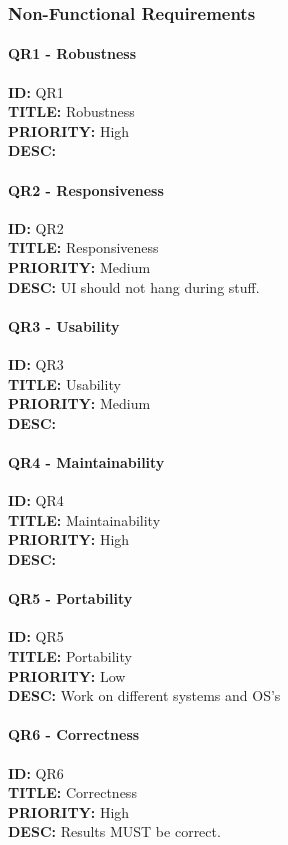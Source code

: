 \subsubsection{Non-Functional Requirements}
\paragraph*{QR1 - Robustness}
\textbf{ID:} QR1 \\
\textbf{TITLE:} Robustness \\
\textbf{PRIORITY:} High \\
\textbf{DESC:}   \\
\paragraph*{QR2 - Responsiveness} 
\textbf{ID:} QR2 \\
\textbf{TITLE:} Responsiveness \\
\textbf{PRIORITY:} Medium \\
\textbf{DESC:} UI should not hang during stuff.   \\
\paragraph*{QR3 - Usability}
\textbf{ID:} QR3 \\
\textbf{TITLE:} Usability \\
\textbf{PRIORITY:} Medium \\
\textbf{DESC:}   \\
\paragraph*{QR4 - Maintainability}
\textbf{ID:} QR4 \\
\textbf{TITLE:} Maintainability \\
\textbf{PRIORITY:} High \\
\textbf{DESC:}   \\
\paragraph*{QR5 - Portability}
\textbf{ID:} QR5 \\
\textbf{TITLE:} Portability \\
\textbf{PRIORITY:} Low \\
\textbf{DESC:} Work on different systems and OS's  \\
\paragraph*{QR6 - Correctness}
\textbf{ID:} QR6  \\
\textbf{TITLE:} Correctness \\
\textbf{PRIORITY:} High \\
\textbf{DESC:} Results MUST be correct.   \\
